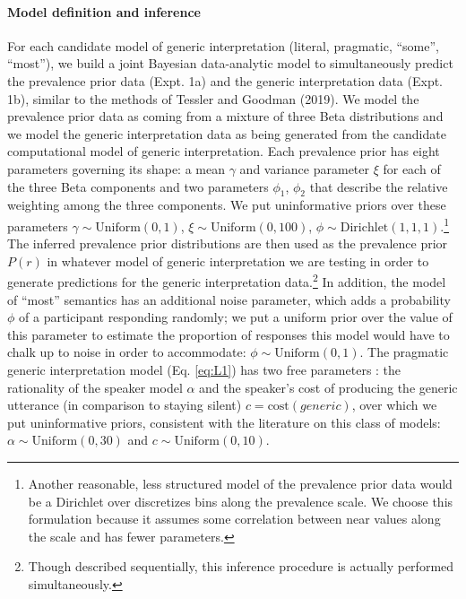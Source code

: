 \documentclass[floatsintext,doc]{apa6}
\let\oldparagraph\paragraph
\renewcommand{\paragraph}[1]{\oldparagraph{#1}\mbox{}}
\let\rmarkdownfootnote\footnote%
\def\footnote{\protect\rmarkdownfootnote}
\begin{document}
\hypertarget{model-definition-and-inference}{%
\paragraph{Model definition and inference}\label{model-definition-and-inference}}

For each candidate model of generic interpretation (literal, pragmatic, \enquote{some}, \enquote{most}), we build a joint Bayesian data-analytic model to simultaneously predict the prevalence prior data (Expt. 1a) and the generic interpretation data (Expt. 1b), similar to the methods of Tessler and Goodman (2019).
We model the prevalence prior data as coming from a mixture of three Beta distributions and we model the generic interpretation data as being generated from the candidate computational model of generic interpretation.
Each prevalence prior has eight parameters governing its shape: a mean \(\gamma\) and variance parameter \(\xi\) for each of the three Beta components and two parameters \(\phi_1\), \(\phi_2\) that describe the relative weighting among the three components.
We put uninformative priors over these parameters \(\gamma \sim \text{Uniform}(0, 1)\), \(\xi \sim \text{Uniform}(0, 100)\), \(\phi \sim \text{Dirichlet}(1,1,1)\).\footnote{Another reasonable, less structured model of the prevalence prior data would be a Dirichlet over discretizes bins along the prevalence scale. We choose this formulation because it assumes some correlation between near values along the scale and has fewer parameters. }
The inferred prevalence prior distributions are then used as the prevalence prior \(P(r)\) in whatever model of generic interpretation we are testing in order to generate predictions for the generic interpretation data.\footnote{Though described sequentially, this inference procedure is actually performed simultaneously.}
In addition, the model of \enquote{most} semantics has an additional noise parameter, which adds a probability \(\phi\) of a participant responding randomly; we put a uniform prior over the value of this parameter to estimate the proportion of responses this model would have to chalk up to noise in order to accommodate: \(\phi \sim \text{Uniform}(0, 1)\).
The pragmatic generic interpretation model (Eq. \ref{eq:L1}) has two free parameters : the rationality of the speaker model \(\alpha\) and the speaker's cost of producing the generic utterance (in comparison to staying silent) \(c = \text{cost}(generic)\), over which we put uninformative priors, consistent with the literature on this class of models: \(\alpha \sim \text{Uniform}(0, 30)\) and \(c \sim \text{Uniform}(0, 10)\).
\end{document}
